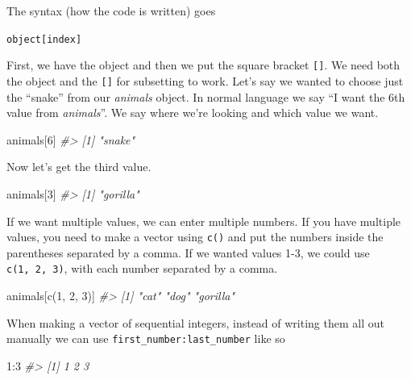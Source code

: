 \documentclass[
]{krantz}
\makeatletter
\newenvironment{Shaded}{\begin{snugshade}}{\end{snugshade}}
\newcommand{\CommentTok}[1]{\textcolor[rgb]{0.37,0.37,0.37}{\textit{#1}}}
\newcommand{\DecValTok}[1]{\textcolor[rgb]{0.06,0.06,0.06}{#1}}
\newcommand{\FunctionTok}[1]{\textcolor[rgb]{0,0,0}{#1}}
\newcommand{\NormalTok}[1]{#1}
\newcommand{\SpecialCharTok}[1]{\textcolor[rgb]{0,0,0}{#1}}
\newenvironment{kframe}{%
\medskip{}
\setlength{\fboxsep}{.8em}
 \def\at@end@of@kframe{}%
 \ifinner\ifhmode%
  \def\at@end@of@kframe{\end{minipage}}%
  \begin{minipage}{\columnwidth}%
 \fi\fi%
 \def\FrameCommand##1{\hskip\@totalleftmargin \hskip-\fboxsep
 \colorbox{shadecolor}{##1}\hskip-\fboxsep
     \hskip-\linewidth \hskip-\@totalleftmargin \hskip\columnwidth}%
 \MakeFramed {\advance\hsize-\width
   \@totalleftmargin\z@ \linewidth\hsize
   \@setminipage}}%
 {\par\unskip\endMakeFramed%
 \at@end@of@kframe}
\renewenvironment{Shaded}{\begin{kframe}}{\end{kframe}}
\makeatother
\begin{document}
The syntax (how the code is written) goes

\texttt{object{[}index{]}}

First, we have the object and then we put the square bracket \texttt{{[}{]}}. We need both the object and the \texttt{{[}{]}} for subsetting to work. Let's say we wanted to choose just the ``snake'' from our \emph{animals} object. In normal language we say ``I want the 6th value from \emph{animals}''. We say where we're looking and which value we want.

\begin{Shaded}
\begin{Highlighting}[]
\NormalTok{animals[}\DecValTok{6}\NormalTok{]}
\CommentTok{\#\textgreater{} [1] "snake"}
\end{Highlighting}
\end{Shaded}

Now let's get the third value.

\begin{Shaded}
\begin{Highlighting}[]
\NormalTok{animals[}\DecValTok{3}\NormalTok{]}
\CommentTok{\#\textgreater{} [1] "gorilla"}
\end{Highlighting}
\end{Shaded}

If we want multiple values, we can enter multiple numbers. If you have multiple values, you need to make a vector using \texttt{c()} and put the numbers inside the parentheses separated by a comma. If we wanted values 1-3, we could use \texttt{c(1,\ 2,\ 3)}, with each number separated by a comma.

\begin{Shaded}
\begin{Highlighting}[]
\NormalTok{animals[}\FunctionTok{c}\NormalTok{(}\DecValTok{1}\NormalTok{, }\DecValTok{2}\NormalTok{, }\DecValTok{3}\NormalTok{)]}
\CommentTok{\#\textgreater{} [1] "cat"     "dog"     "gorilla"}
\end{Highlighting}
\end{Shaded}

When making a vector of sequential integers, instead of writing them all out manually we can use \texttt{first\_number:last\_number} like so

\begin{Shaded}
\begin{Highlighting}[]
\DecValTok{1}\SpecialCharTok{:}\DecValTok{3}
\CommentTok{\#\textgreater{} [1] 1 2 3}
\end{Highlighting}
\end{Shaded}
\end{document}
